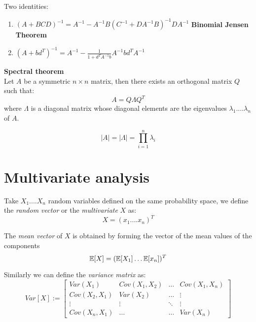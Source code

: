 \begin{prop}
	Two identities:
	\begin{enumerate}
		\item $(A+BCD)^{-1}=A^{-1} -A^{-1}B(C^{-1}+DA^{-1}B)^{-1}DA^{-1}$ \textbf{Binomial Jensen Theorem}
		\item $(A+bd^T)^{-1}=A^{-1}-\frac{1}{1+d^TA^{-1}b}A^{-1}bd^TA^{-1}$
	\end{enumerate}
\end{prop}



\begin{teo}\textbf{Spectral theorem}\\
	Let $A$ be a symmetric $n \times n$ matrix, then there exists an orthogonal matrix $Q$ such that:
	$$A=Q \Lambda Q^T$$
	where $\Lambda$ is a diagonal matrix whose diagonal elements are the eigenvalues $\lambda_1....\lambda_n$ of $A$.
\end{teo}

\begin{corol}
$$|A|=|\Lambda|=\prod_{i=1}^n \lambda_i$$
\end{corol}


\section{Multivariate analysis}

\begin{defi}
Take $X_1....X_n$ random variables defined on the same probability space, we define the \textit{random vector} or the \textit{multivariate \rv} $X$ as:
$$X=(x_1....x_n)^T$$

\end{defi}
\begin{defi}
The \textit{mean vector} of $X$ is obtained by forming the vector of the mean values of the components
$$\mathbb{E}[X]=(\mathbb{E}[X_1] \dots \mathbb{E}[x_n])^T$$
\end{defi}

\begin{defi}
	Similarly we can define the \textit{variance matrix} as:
	\[
	Var[X]:=\begin{bmatrix}
	Var(X_1) & Cov(X_1,X_2) & \dots  & Cov(X_1, X_{n}) \\
	Cov(X_2,X_1) & Var(X_2) &  \dots  & \vdots \\
	\vdots & \vdots  & \ddots & \vdots \\
	Cov(X_n,X_1) & \dots &  \dots  & Var(X_n)
	\end{bmatrix}	
	\]
\end{defi}

